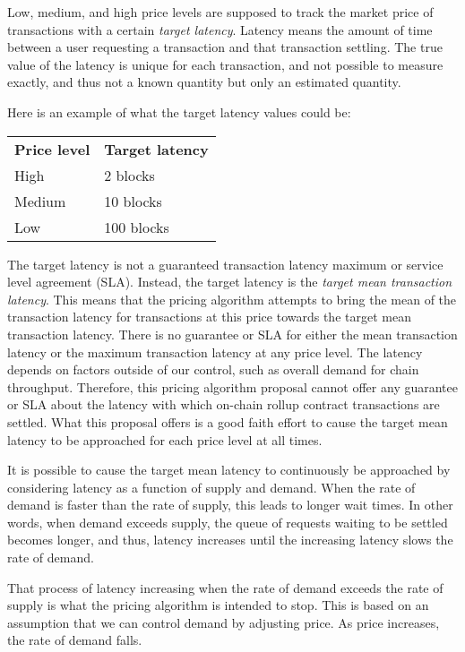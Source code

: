 \documentclass[12pt]{article}
\begin{document}
Low, medium, and high price levels are supposed to track the market price of transactions with a certain \emph{target latency}. Latency means the amount of time between a user requesting a transaction and that transaction settling. The true value of the latency is unique for each transaction, and not possible to measure exactly, and thus not a known quantity but only an estimated quantity.

Here is an example of what the target latency values could be:

\medskip
\begin{tabular}{ll}
	\textbf{Price level} & \textbf{Target latency} \\
	High & 2 blocks \\
	Medium & 10 blocks \\
	Low & 100 blocks
\end{tabular}
\medskip

The target latency is not a guaranteed transaction latency maximum or service level agreement (SLA). Instead, the target latency is the \emph{target mean transaction latency}. This means that the pricing algorithm attempts to bring the mean of the transaction latency for transactions at this price towards the target mean transaction latency. There is no guarantee or SLA for either the mean transaction latency or the maximum transaction latency at any price level. The latency depends on factors outside of our control, such as overall demand for chain throughput. Therefore, this pricing algorithm proposal cannot offer any guarantee or SLA about the latency with which on-chain rollup contract transactions are settled. What this proposal offers is a good faith effort to cause the target mean latency to be approached for each price level at all times.

It is possible to cause the target mean latency to continuously be approached by considering latency as a function of supply and demand. When the rate of demand is faster than the rate of supply, this leads to longer wait times. In other words, when demand exceeds supply, the queue of requests waiting to be settled becomes longer, and thus, latency increases until the increasing latency slows the rate of demand. 

That process of latency increasing when the rate of demand exceeds the rate of supply is what the pricing algorithm is intended to stop. This is based on an assumption that we can control demand by adjusting price. As price increases, the rate of demand falls.
\end{document}
